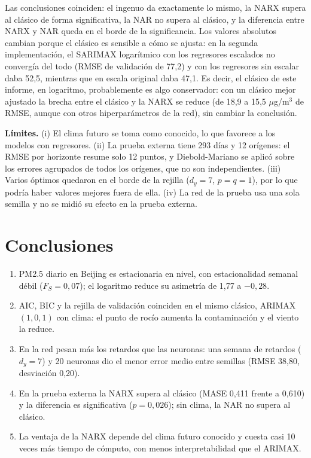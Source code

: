 \documentclass[11pt,letterpaper]{article}
\begin{document}
Las conclusiones coinciden: el ingenuo da exactamente lo mismo, la NARX supera al clásico de forma significativa, la NAR no supera al clásico, y la diferencia entre NARX y NAR queda en el borde de la significancia. Los valores absolutos cambian porque el clásico es sensible a cómo se ajusta: en la segunda implementación, el SARIMAX logarítmico con los regresores escalados no convergía del todo (RMSE de validación de 77,2) y con los regresores sin escalar daba 52,5, mientras que en escala original daba 47,1. Es decir, el clásico de este informe, en logaritmo, probablemente es algo conservador: con un clásico mejor ajustado la brecha entre el clásico y la NARX se reduce (de 18,9 a 15,5 $\mu$g/m$^3$ de RMSE, aunque con otros hiperparámetros de la red), sin cambiar la conclusión.

\textbf{Límites.} (i) El clima futuro se toma como conocido, lo que favorece a los modelos con regresores. (ii) La prueba externa tiene 293 días y 12 orígenes: el RMSE por horizonte resume solo 12 puntos, y Diebold-Mariano se aplicó sobre los errores agrupados de todos los orígenes, que no son independientes. (iii) Varios óptimos quedaron en el borde de la rejilla ($d_y=7$, $p=q=1$), por lo que podría haber valores mejores fuera de ella. (iv) La red de la prueba usa una sola semilla y no se midió su efecto en la prueba externa.

\section{Conclusiones}

\begin{enumerate}
\item PM2.5 diario en Beijing es estacionaria en nivel, con estacionalidad semanal débil ($F_S=0{,}07$); el logaritmo reduce su asimetría de 1,77 a $-0{,}28$.
\item AIC, BIC y la rejilla de validación coinciden en el mismo clásico, ARIMAX$(1,0,1)$ con clima: el punto de rocío aumenta la contaminación y el viento la reduce.
\item En la red pesan más los retardos que las neuronas: una semana de retardos ($d_y=7$) y 20 neuronas dio el menor error medio entre semillas (RMSE 38,80, desviación 0,20).
\item En la prueba externa la NARX supera al clásico (MASE 0,411 frente a 0,610) y la diferencia es significativa ($p=0{,}026$); sin clima, la NAR no supera al clásico.
\item La ventaja de la NARX depende del clima futuro conocido y cuesta casi 10 veces más tiempo de cómputo, con menos interpretabilidad que el ARIMAX.
\end{enumerate}
\end{document}
